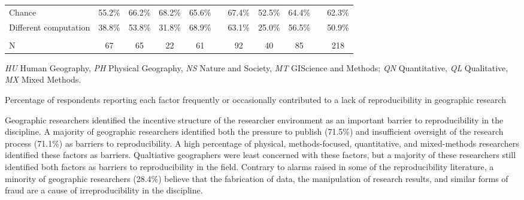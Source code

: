 \documentclass[]{interact}
\theoremstyle{plain}%
\theoremstyle{definition}
\theoremstyle{remark}
\begin{document}
\begin{table}[h]
\begin{threeparttable}
\begin{tabular}{l c c c c c c c c c c}
         Chance                             & 55.2\% & 66.2\% & 68.2\% & 65.6\% & & 67.4\% & 52.5\% & 64.4\% & & 62.3\% \\
         Different computation              & 38.8\% & 53.8\% & 31.8\% & 68.9\% & & 63.1\% & 25.0\% & 56.5\% & & 50.9\% \\
                                            & & & & & & & & & &\\
         N                                  & 67 & 65 & 22 & 61 & & 92 & 40 & 85 & & 218 \\
        \hline
    \end{tabular}
    \begin{tablenotes}
        \footnotesize
        \item \textit{HU} Human Geography, \textit{PH} Physical Geography, \textit{NS} Nature and Society, \textit{MT} GIScience and Methods; \textit{QN} Quantitative, \textit{QL} Qualitative, \textit{MX} Mixed Methods. 
        \item Percentage of respondents reporting each factor frequently or occasionally contributed to a lack of reproducibility in geographic research
    \end{tablenotes}
    \label{tab:barriers}
    \end{threeparttable}
\end{table}

Geographic researchers identified the incentive structure of the researcher environment as an important barrier to reproducibility in the discipline.
A majority of geographic researchers identified both the pressure to publish (71.5\%) and insufficient oversight of the research process (71.1\%) as barriers to reproducibility.
A high percentage of physical, methods-focused, quantitative, and mixed-methods researchers identified these factors as barriers. 
Qualtiative geographers were least concerned with these factors, but a majority of these researchers still identified both factors as barriers to reproducibility in the field.
Contrary to alarms raised in some of the reproducibility literature, a minority of geographic researchers (28.4\%) believe that the fabrication of data, the manipulation of research results, and similar forms of fraud are a cause of irreproducibility in the discipline.
\end{document}
